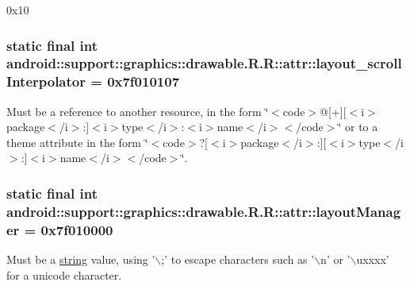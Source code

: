 0x10\hypertarget{classandroid_1_1support_1_1graphics_1_1drawable_1_1_r_1_1attr_243e1c52abac057244fc6803414e9c14}{
\subsubsection[{layout\_\-scrollInterpolator}]{\setlength{\rightskip}{0pt plus 5cm}static final int android::support::graphics::drawable.R.R::attr::layout\_\-scrollInterpolator = 0x7f010107}}
\label{classandroid_1_1support_1_1graphics_1_1drawable_1_1_r_1_1attr_243e1c52abac057244fc6803414e9c14}


Must be a reference to another resource, in the form \char`\"{}$<$code$>$@\mbox{[}+\mbox{]}\mbox{[}$<$i$>$package$<$/i$>$:\mbox{]}$<$i$>$type$<$/i$>$:$<$i$>$name$<$/i$>$$<$/code$>$\char`\"{} or to a theme attribute in the form \char`\"{}$<$code$>$?\mbox{[}$<$i$>$package$<$/i$>$:\mbox{]}\mbox{[}$<$i$>$type$<$/i$>$:\mbox{]}$<$i$>$name$<$/i$>$$<$/code$>$\char`\"{}. \hypertarget{classandroid_1_1support_1_1graphics_1_1drawable_1_1_r_1_1attr_d470a1248816764b35b5536697cdc47c}{
\subsubsection[{layoutManager}]{\setlength{\rightskip}{0pt plus 5cm}static final int android::support::graphics::drawable.R.R::attr::layoutManager = 0x7f010000}}
\label{classandroid_1_1support_1_1graphics_1_1drawable_1_1_r_1_1attr_d470a1248816764b35b5536697cdc47c}


Must be a \hyperlink{classandroid_1_1support_1_1graphics_1_1drawable_1_1_r_1_1string}{string} value, using '$\backslash$;' to escape characters such as '$\backslash$n' or '$\backslash$uxxxx' for a unicode character. 


